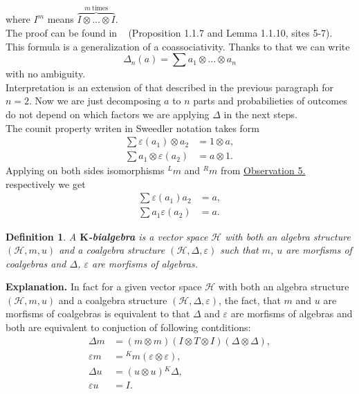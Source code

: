\documentclass[a4paper]{article}
\newtheorem{definition}{Definition}
\begin{document}
where $I^m$ means $\overbrace{I \otimes \dots \otimes I}^{m \mathrm{\ times}}$. \\
The proof can be found in ~\cite{DNR} (Proposition 1.1.7 and Lemma 1.1.10, sites 5-7).
This formula is a generalization of a coassociativity. Thanks to that we can write
\begin{equation*}
\Delta_n(a) = \sum a_1 \otimes \dots \otimes a_n
\end{equation*}
with no ambiguity. \\
Interpretation is an extension of that described in the previous paragraph for $n = 2$. Now we are just 
decomposing $a$ to $n$ parts and probabilieties of outcomes do not depend on which factors we are 
applying $\Delta$ in the next steps. \\[8pt]  
The counit property writen in Sweedler notation takes form
\begin{align*}
\sum\varepsilon(a_1) \otimes a_2 &= 1 \otimes a, \\
\sum a_1 \otimes \varepsilon(a_2) &= a \otimes 1. 
\end{align*}
Applying on both sides isomorphisms ${^Lm}$ and ${^Rm}$ from 
\hyperref[observation:5]{Observation 5.} respectively we get
\begin{align*}
\sum\varepsilon(a_1)a_2 &= a, \\
\sum a_1\varepsilon(a_2) &= a.
\end{align*}
\begin{definition}
A \textbf{$\textbf{K}$-bialgebra} is a vector space $\mathcal{H}$ with both an algebra structure 
$(\mathcal{H}, m, u)$ and a coalgebra structure $(\mathcal{H}, \Delta, \varepsilon)$ such that $m$, $u$ 
are morfisms of coalgebras and $\Delta$, $\varepsilon$ are morfisms of algebras.
\end{definition}
\textbf{Explanation. } In fact for a given vector space $\mathcal{H}$ with both an algebra structure 
$(\mathcal{H}, m, u)$ and a coalgebra structure $(\mathcal{H}, \Delta, \varepsilon)$, the fact, that 
$m$ and $u$ are morfisms of coalgebras is equivalent to that $\Delta$ and $\varepsilon$ are morfisms of 
algebras and both are equivalent to conjuction of following contditions:
\begin{align*}
\Delta m &= (m\otimes m)(I \otimes T \otimes I)(\Delta \otimes \Delta), \\
\varepsilon m &= {^Km}(\varepsilon \otimes \varepsilon), \\
\Delta u &= (u \otimes u){^K\Delta}, \\
\varepsilon u &= I.
\end{align*}
\end{document}
